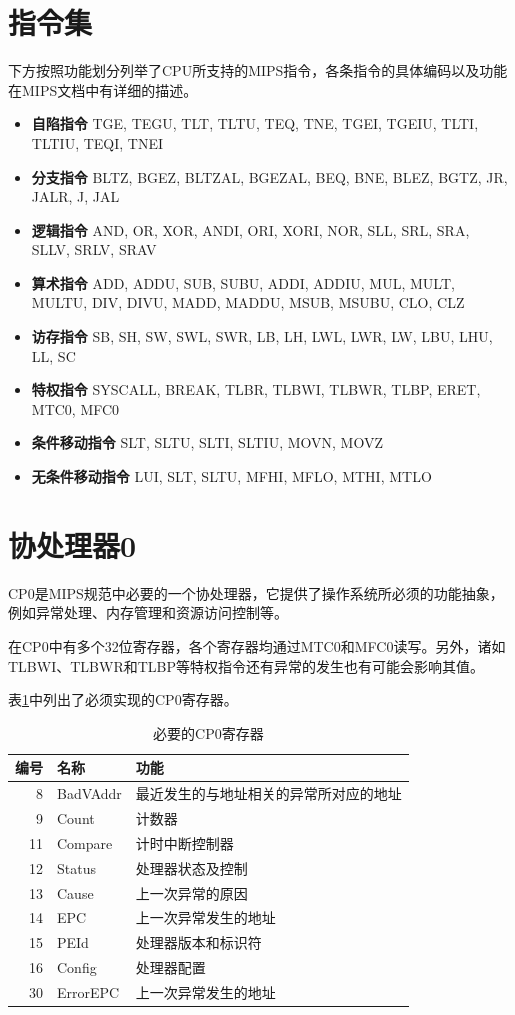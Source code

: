 \section{指令集}
下方按照功能划分列举了CPU所支持的MIPS指令，各条指令的具体编码以及功能在MIPS文档中有详细的描述。
\begin{itemize}
	\item \textbf{自陷指令} TGE, TEGU, TLT, TLTU, TEQ, TNE, TGEI, TGEIU, TLTI, TLTIU, TEQI, TNEI
	\item \textbf{分支指令} BLTZ, BGEZ, BLTZAL, BGEZAL, BEQ, BNE, BLEZ, BGTZ, JR, JALR, J, JAL
	\item \textbf{逻辑指令} AND, OR, XOR, ANDI, ORI, XORI, NOR, SLL, SRL, SRA, SLLV, SRLV, SRAV
	\item \textbf{算术指令} ADD, ADDU, SUB, SUBU, ADDI, ADDIU, MUL, MULT, MULTU, DIV, DIVU, MADD, MADDU, MSUB, MSUBU, CLO, CLZ
	\item \textbf{访存指令} SB, SH, SW, SWL, SWR, LB, LH, LWL, LWR, LW, LBU, LHU, LL, SC
	\item \textbf{特权指令} SYSCALL, BREAK, TLBR, TLBWI, TLBWR, TLBP, ERET, MTC0, MFC0
	\item \textbf{条件移动指令} SLT, SLTU, SLTI, SLTIU, MOVN, MOVZ
	\item \textbf{无条件移动指令} LUI, SLT, SLTU, MFHI, MFLO, MTHI, MTLO 
\end{itemize}

\section{协处理器0}
CP0是MIPS规范中必要的一个协处理器，它提供了操作系统所必须的功能抽象，例如异常处理、内存管理和资源访问控制等。

在CP0中有多个32位寄存器，各个寄存器均通过MTC0和MFC0读写。另外，诸如TLBWI、TLBWR和TLBP等特权指令还有异常的发生也有可能会影响其值。

表\ref{table:required_cp0_registers}中列出了必须实现的CP0寄存器。

\begin{table}[!htbp]
    \centering
    \begin{tabular}{|r|l|l|}
    \hline
    \textbf{编号} & \textbf{名称} & \textbf{功能}  \\ \hline
	8 & BadVAddr & 最近发生的与地址相关的异常所对应的地址 \\ \hline
	9 & Count & 计数器 \\ \hline
	11 & Compare & 计时中断控制器 \\ \hline
	12 & Status & 处理器状态及控制 \\ \hline
	13 & Cause & 上一次异常的原因 \\ \hline
	14 & EPC & 上一次异常发生的地址 \\ \hline
	15 & PEId & 处理器版本和标识符 \\ \hline
	16 & Config & 处理器配置 \\ \hline
	30 & ErrorEPC & 上一次异常发生的地址 \\ \hline
    \end{tabular}
    \caption{必要的CP0寄存器}
    \label{table:required_cp0_registers}
\end{table}

